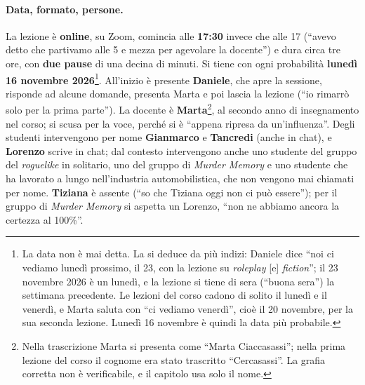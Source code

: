 \paragraph{Data, formato, persone.} La lezione è \textbf{online}, su Zoom, comincia alle
\textbf{17:30} invece che alle 17 (``avevo detto che partivamo alle 5 e mezza per
agevolare la docente'') e dura circa tre ore, con \textbf{due pause} di una decina di
minuti. Si tiene con ogni probabilità \textbf{lunedì 16 novembre
2026}\footnote{La data non è mai detta. La si deduce da più indizi: Daniele dice ``noi
ci vediamo lunedì prossimo, il 23, con la lezione su \emph{roleplay} [e]
\emph{fiction}''; il 23 novembre 2026 è un lunedì, e la lezione si tiene di sera (``buona
sera'') la settimana precedente. Le lezioni del corso cadono di solito il lunedì e il
venerdì, e Marta saluta con ``ci vediamo venerdì'', cioè il 20 novembre, per la sua
seconda lezione. Lunedì 16 novembre è quindi la data più probabile.}. All'inizio è
presente \textbf{Daniele}, che apre la sessione, risponde ad alcune domande, presenta
Marta e poi lascia la lezione (``io rimarrò solo per la prima parte''). La docente è
\textbf{Marta}\footnote{Nella trascrizione Marta si presenta come ``Marta Ciaccasassi'';
nella prima lezione del corso il cognome era stato trascritto ``Cercasassi''. La grafia
corretta non è verificabile, e il capitolo usa solo il nome.}, al secondo anno di
insegnamento nel corso; si scusa per la voce, perché si è ``appena ripresa da
un'influenza''. Degli studenti intervengono per nome \textbf{Gianmarco} e
\textbf{Tancredi} (anche in chat), e \textbf{Lorenzo} scrive in chat; dal contesto
intervengono anche uno studente del gruppo del \emph{roguelike} in solitario, uno del
gruppo di \emph{Murder Memory} e uno studente che ha lavorato a lungo nell'industria
automobilistica, che non vengono mai chiamati per nome. \textbf{Tiziana} è assente
(``so che Tiziana oggi non ci può essere''); per il gruppo di \emph{Murder Memory} si
aspetta un Lorenzo, ``non ne abbiamo ancora la certezza al 100\%''.

